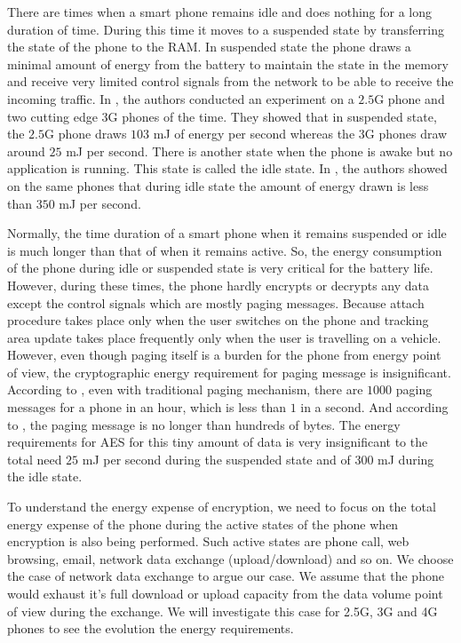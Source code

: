 \documentclass[lnicst,sechang,a4paper]{svmultln}
\begin{document}
There are times when a smart phone remains idle and does nothing for a long duration of time. During this time it moves to a suspended state by transferring the state of the phone to the RAM. In suspended state the phone draws a minimal amount of energy from the battery to maintain the state in the memory and receive very limited control signals from the network to be able to receive the incoming traffic. In \cite{Usenix_2010}, the authors conducted an experiment on a $2.5$G phone and two cutting edge $3$G phones of the time. They showed that in suspended state, the $2.5$G phone draws $103$ mJ of energy per second whereas the 3G phones draw around $25$ mJ per second. There is another state when the phone is awake but no application is running. This state is called the idle state. In \cite{Usenix_2010}, the authors showed on the same phones that during idle state the amount of energy drawn is less than $350$ mJ per second. 

Normally, the time duration of a smart phone when it remains suspended or idle is much longer than that of when it remains active. So, the energy consumption of the phone during idle or suspended state is very critical for the battery life. However, during these times, the phone hardly encrypts or decrypts any data except the control signals which are mostly paging messages. Because attach procedure takes place only when the user switches on the phone and tracking area update takes place frequently only when the user is travelling on a vehicle. However, even though paging itself is a burden for the phone from energy point of view, the cryptographic energy requirement for paging message is insignificant. According to \cite{Nokia_2013}, even with traditional paging mechanism, there are $1000$ paging messages for a phone in an hour, which is less than $1$ in a second. And according to \cite{3GPP_TS_36_331}, the paging message is no longer than hundreds of bytes. The energy requirements for AES for this tiny amount of data is very insignificant to the total need $25$ mJ per second during the suspended state and of 300 mJ during the idle state.

To understand the energy expense of encryption, we need to focus on the total energy expense of the phone during the active states of the phone when encryption is also being performed. Such active states are phone call, web browsing, email, network data exchange (upload/download) and so on. We choose the case of network data exchange to argue our case. We assume that the phone would exhaust it's full download or upload capacity from the data volume point of view during the exchange. We will investigate this case for 2.5G, 3G and 4G phones to see the evolution the energy requirements.
\end{document}
